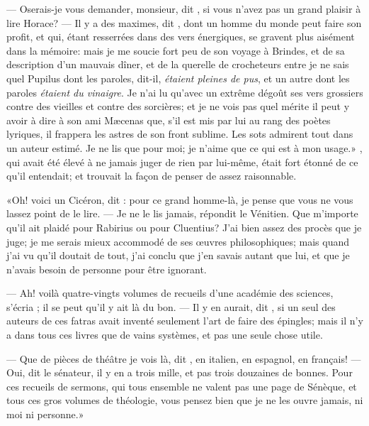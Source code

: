 — Oserais-je vous demander, monsieur, dit , si vous n’avez pas un
grand plaisir à lire Horace? — Il y a des maximes, dit , dont
un homme du monde peut faire son profit, et qui, étant resserrées dans
des vers énergiques, se gravent plus aisément dans la mémoire: mais je
me soucie fort peu de son voyage à Brindes, et de sa description d’un
mauvais dîner, et de la querelle de crocheteurs entre je ne sais quel
Pupilus dont les paroles, dit-il, \emph{étaient pleines de pus}, et un
autre dont les paroles \emph{étaient du vinaigre}. Je n’ai lu qu’avec un
extrême dégoût ses vers grossiers contre des vieilles et contre des
sorcières; et je ne vois pas quel mérite il peut y avoir à dire à son
ami Mæcenas que, s’il est mis par lui au rang des poètes lyriques, il
frappera les astres de son front sublime. Les sots admirent tout
dans un auteur estimé. Je ne lis que pour moi; je n’aime que ce qui est
à mon usage.» , qui avait été élevé à ne jamais juger de rien par
lui-même, était fort étonné de ce qu’il entendait; et  trouvait
la façon de penser de  assez raisonnable.


«Oh! voici un Cicéron, dit : pour ce grand homme-là, je pense que
vous ne vous lassez point de le lire. 
%
— Je ne le lis jamais, répondit le
Vénitien. Que m’importe qu’il ait plaidé pour Rabirius ou pour
Cluentius? J’ai bien assez des procès que je juge; je me serais mieux
accommodé de ses œuvres philosophiques; mais quand j’ai vu qu’il
doutait de tout, j’ai conclu que j’en savais autant que lui, et que je
n’avais besoin de personne pour être ignorant.



— Ah! voilà quatre-vingts volumes de recueils d’une académie des
sciences, s’écria ; il se peut qu’il y ait là du bon. — Il y en
aurait, dit , si un seul des auteurs de ces fatras avait
inventé seulement l’art de faire des épingles; mais il n’y a dans tous
ces livres que de vains systèmes, et pas une seule chose utile.

— Que de pièces de théâtre je vois là, dit , en italien, en
espagnol, en français! — Oui, dit le sénateur, il y en a trois mille, et
pas trois douzaines de bonnes. Pour ces recueils de sermons, qui tous
ensemble ne valent pas une page de Sénèque, et tous ces gros volumes de
théologie, vous pensez bien que je ne les ouvre jamais, ni moi ni
personne.»



